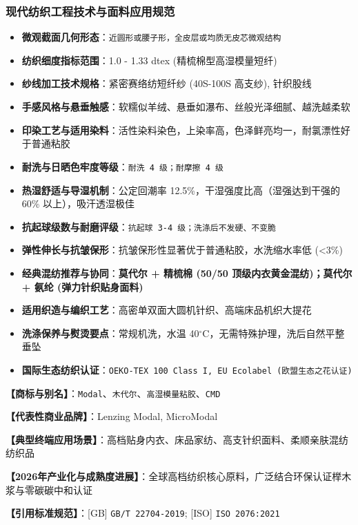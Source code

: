 \documentclass[11pt,openright,twoside,UTF8]{ctexbook}
\begin{document}
\subsubsection*{现代纺织工程技术与面料应用规范}
\begin{itemize} \setlength{\itemsep}{2pt}
    \item \textbf{微观截面几何形态}：\texttt{近圆形或腰子形，全皮层或均质无皮芯微观结构}
    \item \textbf{纺织细度指标范围}：1.0 - 1.33 dtex (精梳棉型高湿模量短纤)
    \item \textbf{纱线加工技术规格}：紧密赛络纺短纤纱 (40S-100S 高支纱), 针织股线
    \item \textbf{手感风格与悬垂触感}：软糯似羊绒、悬垂如瀑布、丝般光泽细腻、越洗越柔软
    \item \textbf{印染工艺与适用染料}：活性染料染色，上染率高，色泽鲜亮均一，耐氯漂性好于普通粘胶
    \item \textbf{耐洗与日晒色牢度等级}：\texttt{耐洗 4 级；耐摩擦 4 级}
    \item \textbf{热湿舒适与导湿机制}：公定回潮率 12.5\%，干湿强度比高（湿强达到干强的 60\% 以上），吸汗透湿极佳
    \item \textbf{抗起球级数与耐磨评级}：\texttt{抗起球 3-4 级；洗涤后不发硬、不变脆}
    \item \textbf{弹性伸长与抗皱保形}：抗皱保形性显著优于普通粘胶，水洗缩水率低 (\textless{}3\%)
    \item \textbf{经典混纺推荐与协同}：\textbf{莫代尔 + 精梳棉 (50/50 顶级内衣黄金混纺)；莫代尔 + 氨纶 (弹力针织贴身面料)}
    \item \textbf{适用织造与编织工艺}：高密单双面大圆机针织、高端床品机织大提花
    \item \textbf{洗涤保养与熨烫要点}：常规机洗，水温 40$^\circ\mathrm{C}$，无需特殊护理，洗后自然平整垂坠
    \item \textbf{国际生态纺织认证}：\texttt{OEKO-TEX 100 Class I, EU Ecolabel (欧盟生态之花认证)}
\end{itemize}
\vspace{0.2cm}

\noindent\textbf{【商标与别名】}：\texttt{Modal}、\texttt{木代尔}、\texttt{高湿模量粘胶}、\texttt{CMD}\par
\noindent\textbf{【代表性商业品牌】}：Lenzing Modal, MicroModal\par
\noindent\textbf{【典型终端应用场景】}：高档贴身内衣、床品家纺、高支针织面料、柔顺亲肤混纺纺织品\par
\noindent\textbf{【2026年产业化与成熟度进展】}：全球高档纺织核心原料，广泛结合环保认证榉木浆与零碳碳中和认证\par
\noindent\textbf{【引用标准规范】}：[GB] \texttt{GB/T 22704-2019}; [ISO] \texttt{ISO 2076:2021}\par
\vspace{0.5cm}
\end{document}
